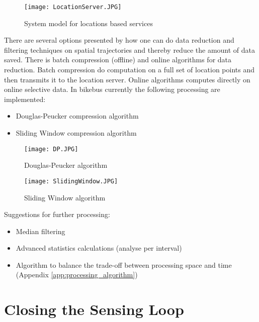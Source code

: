 \begin{figure}[H]
\centering
\texttt{[image: LocationServer.JPG]}

\caption{System model for locations based services}
\label{fig:system_model_for_locations_based_services}
\end{figure}


There are several options presented by \cite{Lee2011} how one can do data reduction and filtering techniques on spatial trajectories and thereby reduce the amount of data saved. There is batch compression (offline) and online algorithms for data reduction. Batch compression do computation on a full set of location points and then transmits it to the location server. Online algorithms computes directly on online selective data. In bikebus currently the following processing are implemented:
\begin{itemize}
    \item Douglas-Peucker compression algorithm
    \item Sliding Window compression algorithm
\end{itemize}

\begin{figure}[H]
\centering
\texttt{[image: DP.JPG]}

\caption{Douglas-Peucker algorithm}
\label{fig:douglas_peucker_algorithm}
\end{figure}



\begin{figure}[H]
\centering
\texttt{[image: SlidingWindow.JPG]}

\caption{Sliding Window algorithm}
\label{fig:sliding_window_algorithm}
\end{figure}


Suggestions for further processing:
\begin{itemize}
    \item Median filtering
    \item Advanced statistics calculations (analyse per interval)
    \item Algorithm to balance the trade-off between processing space and time (Appendix \ref{app:processing_algorithm})
\end{itemize}


\section{Closing the Sensing Loop}
